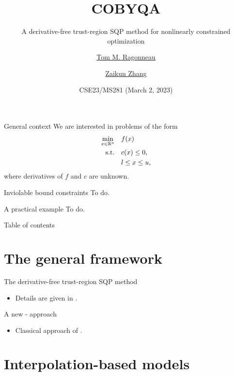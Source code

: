 \documentclass{presentation}
\title{COBYQA}
\subtitle{A derivative-free trust-region SQP method for nonlinearly constrained optimization}
\date{CSE23/MS281 (March 2, 2023)}
\author{\href{https://www.tomragonneau.com/}{Tom M. Ragonneau} \and \href{https://www.zhangzk.net/}{Zaikun Zhang}}
\institute{
    Department of Applied Mathematics\\
    The Hong Kong Polytechnic University
}
\newcommand{\obj}{f}
\newcommand{\con}{c}
\newcommand{\xl}{l}
\newcommand{\xu}{u}
\begin{document}
\maketitle

\begin{frame}{General context}
    We are interested in problems of the form
    \begin{align*}
        \min_{x \in \R^n}   & \quad \obj(x)\\
        \mathrm{s.t.}       & \quad \con(x) \le 0,\\
                            & \quad \xl \le x \le \xu,
    \end{align*}
    where derivatives of $\obj$ and $\con$ are \alert{unknown}.
\end{frame}

\begin{frame}{Inviolable bound constraints}
    To do.
\end{frame}

\begin{frame}{A practical example}
    To do.
\end{frame}

\begin{frame}{Table of contents}
    \tableofcontents[hideallsubsections]
\end{frame}

\section{The general framework}

\begin{frame}{The derivative-free trust-region SQP method}
    \begin{itemize}
        \item Details are given in \textcite{Ragonneau_2022}.
    \end{itemize}
\end{frame}

\begin{frame}{A new \citeauthor{Byrd_1987}-\citeauthor{Omojokun_1989} approach}
    \begin{itemize}
        \item Classical approach of \textcite{Conn_Gould_Toint_2000}.
    \end{itemize}
\end{frame}

\section{Interpolation-based models}
\end{document}
